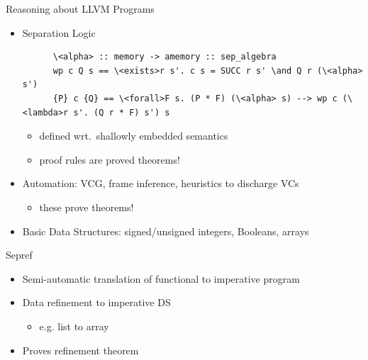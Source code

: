 \documentclass[fleqn]{beamer}
\begin{document}
\begin{frame}[fragile]{Reasoning about LLVM Programs}
  \begin{itemize}
   \item<+-> Separation Logic
    \begin{lstlisting}
      \<alpha> :: memory -> amemory :: sep_algebra
      wp c Q s == \<exists>r s'. c s = SUCC r s' \and Q r (\<alpha> s')
      {P} c {Q} == \<forall>F s. (P * F) (\<alpha> s) --> wp c (\<lambda>r s'. (Q r * F) s') s
    \end{lstlisting}

    \begin{itemize}
     \item defined wrt.\ shallowly embedded semantics
     \item proof rules are proved theorems!

    \end{itemize}
   \item<+-> Automation: VCG, frame inference, heuristics to discharge VCs
    \begin{itemize}
     \item these prove theorems!

    \end{itemize}
   \item<+-> Basic Data Structures: signed/unsigned integers, Booleans, arrays

  \end{itemize}
\end{frame}
\begin{frame}{Sepref}
  \begin{itemize}
   \item Semi-automatic translation of functional to imperative program
   \item Data refinement to imperative DS
    \begin{itemize}
     \item e.g. list to array
    \end{itemize}
   \item Proves refinement theorem

  \end{itemize}
\end{frame}
\end{document}
